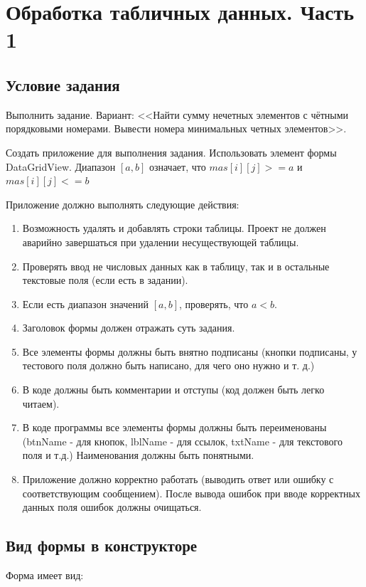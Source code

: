 \section{Обработка табличных данных. Часть 1}
\subsection{Условие задания}
Выполнить задание. Вариант: <<Найти сумму нечетных элементов с чётными порядковыми номерами. Вывести номера минимальных четных элементов>>.

Создать приложение для выполнения задания. Использовать элемент формы DataGridView. Диапазон $[a,b]$ означает, что $mas[i][j] >= a$ и $mas[i][j] <= b$

Приложение должно выполнять следующие действия:

\begin{enumerate}
\item Возможность удалять и добавлять строки таблицы. Проект не должен аварийно завершаться при удалении несуществующей таблицы.
\item Проверять ввод не числовых данных как в таблицу, так и в остальные текстовые поля (если есть в задании).
\item Если есть диапазон значений $[a,b]$, проверять, что $a < b$.
\item Заголовок формы должен отражать суть задания.
\item Все элементы формы должны быть внятно подписаны (кнопки подписаны, у тестового поля должно быть написано, для чего оно нужно и т. д.)
\item В коде должны быть комментарии и отступы (код должен быть легко читаем).
\item В коде программы все элементы формы должны быть переименованы (btnName -  для кнопок, lblName - для ссылок, txtName - для текстового поля и т.д.) Наименования должны быть понятными.
\item Приложение должно корректно работать (выводить ответ или ошибку с соответствующим сообщением). После вывода ошибок при вводе корректных данных поля ошибок должны очищаться.  
\end{enumerate}

\subsection{Вид формы в конструкторе}
Форма имеет вид:

